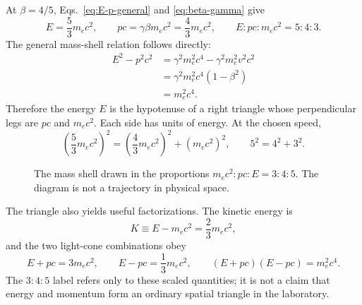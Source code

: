 \documentclass[12pt]{article}
\begin{document}
At $\beta=4/5$, Eqs.~\eqref{eq:E-p-general} and \eqref{eq:beta-gamma} give
\begin{equation}
  E=\frac{5}{3}m_ec^2,
  \qquad
  pc=\gamma\beta m_ec^2=\frac{4}{3}m_ec^2,
  \qquad
  E:pc:m_ec^2=5:4:3.
  \label{eq:triangle-values}
\end{equation}
The general mass-shell relation follows directly:
\begin{align}
  E^2-p^2c^2
  &=\gamma^2m_e^2c^4-\gamma^2m_e^2v^2c^2 \\
  &=\gamma^2m_e^2c^4(1-\beta^2) \\
  &=m_e^2c^4.
  \label{eq:mass-shell-derivation}
\end{align}
Therefore the energy $E$ is the hypotenuse of a right triangle whose perpendicular legs are $pc$ and $m_ec^2$. Each side has units of energy. At the chosen speed,
\begin{equation}
  \left(\frac{5}{3}m_ec^2\right)^2
  =\left(\frac{4}{3}m_ec^2\right)^2+(m_ec^2)^2,
  \qquad
  5^2=4^2+3^2.
  \label{eq:345-triangle}
\end{equation}

\begin{figure}[ht]
  \centering
  \caption{The mass shell drawn in the proportions $m_ec^2:pc:E=3:4:5$. The diagram is not a trajectory in physical space.}
  \label{fig:energy-triangle}
\end{figure}

The triangle also yields useful factorizations. The kinetic energy is
\begin{equation}
  K\equiv E-m_ec^2=\frac{2}{3}m_ec^2,
  \label{eq:exact-kinetic}
\end{equation}
and the two light-cone combinations obey
\begin{equation}
  E+pc=3m_ec^2,
  \qquad
  E-pc=\frac{1}{3}m_ec^2,
  \qquad
  (E+pc)(E-pc)=m_e^2c^4.
  \label{eq:light-cone-factors}
\end{equation}
The $3{:}4{:}5$ label refers only to these scaled quantities; it is not a claim that energy and momentum form an ordinary spatial triangle in the laboratory.
\end{document}
